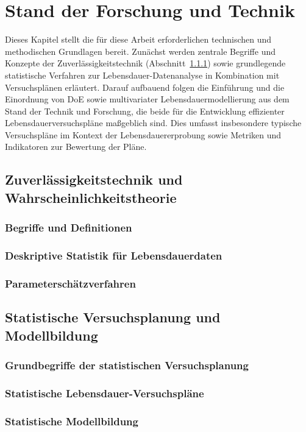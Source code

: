 
\chapter{Stand der Forschung und Technik} \label{chap:stand}

Dieses Kapitel stellt die für diese Arbeit erforderlichen technischen und methodischen Grundlagen bereit. Zunächst werden zentrale Begriffe und Konzepte der Zuverlässigkeitstechnik (Abschnitt~\ref{subsec:begriffezUV}) sowie grundlegende statistische Verfahren zur Lebensdauer-Datenanalyse in Kombination mit Versuchsplänen erläutert.
Darauf aufbauend folgen die Einführung und die Einordnung von \acs{DoE} sowie multivariater Lebensdauermodellierung aus dem Stand der Technik und Forschung, die beide für die Entwicklung effizienter Lebensdauerversuchspläne maßgeblich sind.
Dies umfasst insbesondere typische Versuchspläne im Kontext der Lebensdauererprobung sowie Metriken und Indikatoren zur Bewertung der Pläne.

\section{Zuverlässigkeitstechnik und Wahrscheinlichkeitstheorie} \label{sec:zuv}

\subsection{Begriffe und Definitionen} \label{subsec:begriffezUV}

\subsection{Deskriptive Statistik für Lebensdauerdaten} \label{subsec.Stat}

\subsection{Parameterschätzverfahren} \label{subsec.Schätzer}

\section{Statistische Versuchsplanung und Modellbildung} \label{sec.DoE}

\subsection{Grundbegriffe der statistischen Versuchsplanung} \label{subsec.BegriffeDoE}

\subsection{Statistische Lebensdauer-Versuchspläne} \label{subsec.Pläne}

\subsection{Statistische Modellbildung} \label{subsec.Model}
